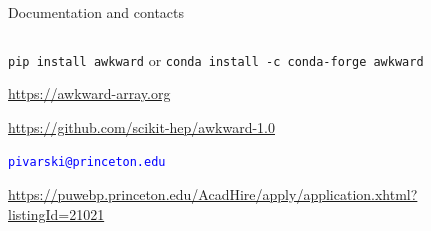 \documentclass[aspectratio=169]{beamer}
\begin{document}
\begin{frame}{Documentation and contacts}
\vspace{0.4 cm}
\Large
\begin{columns}
\begin{description}\setlength{\itemsep}{0.4 cm}
\item[\textcolor{darkorange}{\bf Install:}] \texttt{pip install awkward} or \texttt{conda install -c conda-forge awkward}
\item[\textcolor{darkorange}{\bf Docs:}] \textcolor{blue}{\url{https://awkward-array.org}}
\item[\textcolor{darkorange}{\bf GitHub:}] \textcolor{blue}{\url{https://github.com/scikit-hep/awkward-1.0}}
\item[\textcolor{darkorange}{\bf Contact:}] \textcolor{blue}{\tt pivarski@princeton.edu}
\item[\textcolor{darkorange}{\bf Postdoc opportunity:}] {\small \textcolor{blue}{\url{https://puwebp.princeton.edu/AcadHire/apply/application.xhtml?listingId=21021}}}
\end{description}
\end{columns}
\end{frame}
\end{document}
